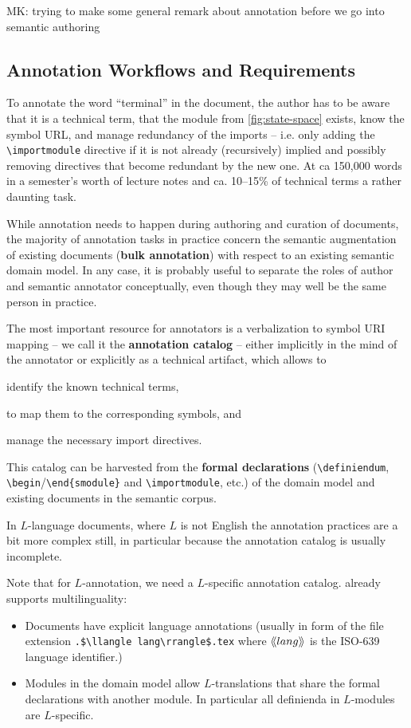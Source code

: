 \documentclass{llncs}
\def\llangle{\langle\kern-.2em\langle}
\def\rrangle{\rangle\kern-.2em\rangle}
\begin{document}
\begin{newpart}{MK: trying to make some general remark about annotation before we go into
    semantic authoring}
\subsection{Annotation Workflows and Requirements}

To annotate the word ``terminal'' in the document, the author has to be aware that it is a
technical term, that the module from \cref{fig:state-space} exists, know the symbol URL,
and manage redundancy of the imports -- i.e. only adding the \lstinline|\importmodule|
directive if it is not already (recursively) implied and possibly removing directives that
become redundant by the new one.  At ca 150,000 words in a semester's worth of lecture
notes and ca. 10--15\% of technical terms a rather daunting task.

While annotation needs to happen during authoring and curation of documents, the majority
of annotation tasks in practice concern the semantic augmentation of existing documents
(\textbf{bulk annotation}) with respect to an existing semantic domain model. In any case,
it is probably useful to separate the roles of author and semantic annotator conceptually,
even though they may well be the same person in practice.

The most important resource for annotators is a verbalization to symbol URI mapping -- we
call it the \textbf{annotation catalog} -- either implicitly in the mind of the annotator
or explicitly as a technical artifact, which allows to
\begin{inparaenum}[\em i\rm)]
\item identify the known technical terms,
\item to map them to the corresponding symbols, and 
\item manage the necessary import directives.
\end{inparaenum}
This catalog can be harvested from the \textbf{formal declarations}
(\lstinline|\definiendum|, \lstinline|\begin|/\lstinline|\end{smodule}| and
\lstinline|\importmodule|, etc.) of the domain model and existing documents in the
semantic corpus.

In $L$-language documents, where $L$ is not English the annotation practices are a bit
more complex still, in particular because the annotation catalog is usually incomplete.

Note that for $L$-annotation, we need a $L$-specific annotation catalog. 
\sTeX already supports multilinguality:
\begin{itemize}
\item Documents have explicit language annotations (usually in form of the file extension
  \lstinline[mathescape]|.$\llangle lang\rrangle$.tex| where $\llangle lang\rrangle$ is the
  ISO-639 language identifier.)
\item Modules in the domain model allow $L$-translations that share the formal
  declarations with another module. In particular all definienda in $L$-modules are
  $L$-specific.
\end{itemize}


\end{newpart}
\end{document}
